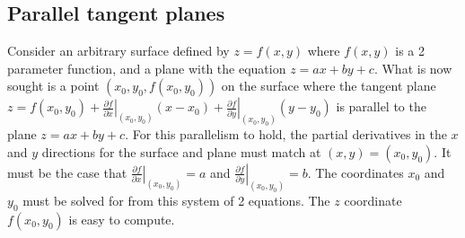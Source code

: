 \documentclass{article}
\begin{document}
\subsection*{Parallel tangent planes}

Consider an arbitrary surface defined by \(z = f(x, y)\) where \(f(x, y)\) is a 2 parameter function, and a plane with the equation \(z = a x + b y + c\). What is now sought is a point \((x_0, y_0, f(x_0,y_0))\) on the surface where the tangent plane \(z = f(x_0, y_0) + \left.\frac{\partial f}{\partial x}\right|_{(x_0, y_0)} (x - x_0) + \left.\frac{\partial f}{\partial y}\right|_{(x_0, y_0)} (y - y_0)\) is parallel to the plane \(z = a x + b y + c\). For this parallelism to hold, the partial derivatives in the \(x\) and \(y\) directions for the surface and plane must match at \((x, y) = (x_0, y_0)\). It must be the case that \(\left.\frac{\partial f}{\partial x}\right|_{(x_0, y_0)} = a\) and \(\left.\frac{\partial f}{\partial y}\right|_{(x_0, y_0)} = b\). The coordinates \(x_0\) and \(y_0\) must be solved for from this system of 2 equations. The \(z\) coordinate \(f(x_0, y_0)\) is easy to compute.

\vspace{5mm}
\end{document}
